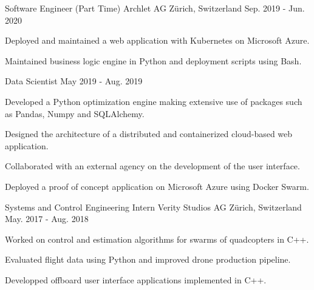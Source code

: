 
\begin{cventries}

  \cventry
    {Software Engineer (Part Time)} %
    {Archlet AG} %
    {Z\"urich, Switzerland} %
    {Sep. 2019 - Jun. 2020} %
    {
      \begin{cvitems} %
        \item {Deployed and maintained a web application with Kubernetes on Microsoft Azure.}
        \item {Maintained business logic engine in Python and deployment scripts using Bash.}
      \end{cvitems}
    }

\vspace*{-0.15cm}  
\cventry
    {Data Scientist} %
    {} %
    {} %
    {May 2019 - Aug. 2019} %
    {
      \begin{cvitems} %
        \item {Developed a Python optimization engine making extensive use of packages such as Pandas, Numpy and SQLAlchemy.}
        \item {Designed the architecture of a distributed and containerized cloud-based web application.}
        \item {Collaborated with an external agency on the development of the user interface.}
        \item {Deployed a proof of concept application on Microsoft Azure using Docker Swarm.}
      \end{cvitems}
    }

  \cventry
    {Systems and Control Engineering Intern} %
    {Verity Studios AG} %
    {Z\"urich, Switzerland} %
    {May. 2017 - Aug. 2018} %
    {
      \begin{cvitems} %
        \item {Worked on control and estimation algorithms for swarms of quadcopters in C++.}
        \item {Evaluated flight data using Python and improved drone production pipeline.}
        \item {Developped offboard user interface applications implemented in C++.}
      \end{cvitems}
    }


\end{cventries}
